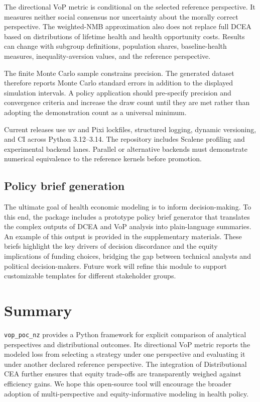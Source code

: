 \documentclass[article]{jss}
\newcommand{\pkg}[1]{\texttt{#1}}
\begin{document}
The directional VoP metric is conditional on the selected reference
perspective. It measures neither social consensus nor uncertainty about the
morally correct perspective. The weighted-NMB approximation also does not
replace full DCEA based on distributions of lifetime health and health
opportunity costs. Results can change with subgroup definitions, population
shares, baseline-health measures, inequality-aversion values, and the
reference perspective.

The finite Monte Carlo sample constrains precision. The generated dataset
therefore reports Monte Carlo standard errors in addition to the displayed
simulation intervals. A policy application should pre-specify precision and
convergence criteria and increase the draw count until they are met rather than
adopting the demonstration count as a universal minimum.

Current releases use uv and Pixi lockfiles, structured logging, dynamic
versioning, and CI across Python 3.12--3.14.
The repository includes Scalene profiling and experimental backend lanes.
Parallel or alternative backends must demonstrate numerical equivalence to
the reference kernels before promotion.

\subsection{Policy brief generation}
The ultimate goal of health economic modeling is to inform decision-making.
To this end, the package includes a prototype policy brief generator that translates the complex outputs of DCEA and VoP analysis into plain-language summaries.
An example of this output is provided in the supplementary materials.
These briefs highlight the key drivers of decision discordance and the equity implications of funding choices, bridging the gap between technical analysts and political decision-makers.
Future work will refine this module to support customizable templates for different stakeholder groups.

\section{Summary} \label{sec:summary}

\pkg{vop\_poc\_nz} provides a Python framework for explicit comparison of analytical perspectives and distributional outcomes.
Its directional VoP metric reports the modeled loss from selecting a strategy under one perspective and evaluating it under another declared reference perspective.
The integration of Distributional CEA further ensures that equity trade-offs are transparently weighed against efficiency gains.
We hope this open-source tool will encourage the broader adoption of multi-perspective and equity-informative modeling in health policy.
\end{document}
